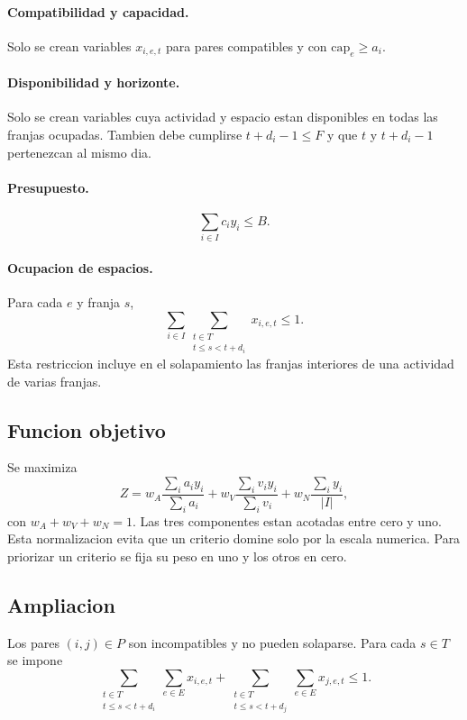 \paragraph{Compatibilidad y capacidad.}
Solo se crean variables $x_{i,e,t}$ para pares compatibles y con $\mathrm{cap}_e\geq a_i$.

\paragraph{Disponibilidad y horizonte.}
Solo se crean variables cuya actividad y espacio estan disponibles en todas las franjas ocupadas. Tambien debe cumplirse $t+d_i-1\leq F$ y que $t$ y $t+d_i-1$ pertenezcan al mismo dia.

\paragraph{Presupuesto.}
\[
\sum_{i\in I}c_i y_i\leq B.
\]

\paragraph{Ocupacion de espacios.}
Para cada $e$ y franja $s$,
\[
\sum_{i\in I}\sum_{\substack{t\in T\\t\leq s<t+d_i}}
x_{i,e,t}\leq 1.
\]
Esta restriccion incluye en el solapamiento las franjas interiores de una actividad de varias franjas.

\subsection{Funcion objetivo}

Se maximiza
\[
Z=
w_A\frac{\sum_i a_i y_i}{\sum_i a_i}
+
w_V\frac{\sum_i v_i y_i}{\sum_i v_i}
+
w_N\frac{\sum_i y_i}{|I|},
\]
con $w_A+w_V+w_N=1$. Las tres componentes estan acotadas entre cero y uno. Esta normalizacion evita que un criterio domine solo por la escala numerica. Para priorizar un criterio se fija su peso en uno y los otros en cero.

\subsection{Ampliacion}

Los pares $(i,j)\in P$ son incompatibles y no pueden solaparse. Para cada $s\in T$ se impone
\[
\sum_{\substack{t\in T\\t\leq s<t+d_i}}\sum_{e\in E}x_{i,e,t}
+
\sum_{\substack{t\in T\\t\leq s<t+d_j}}\sum_{e\in E}x_{j,e,t}
\leq 1.
\]
